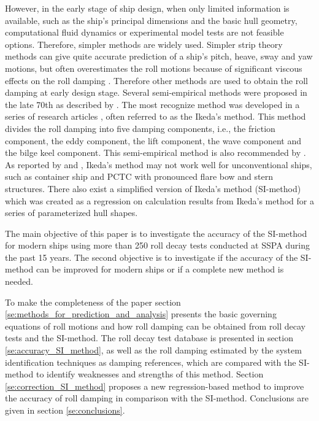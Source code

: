 However, in the early stage of ship design, when only limited information is available, such as the ship's principal dimensions and the basic hull geometry, computational fluid dynamics or experimental model tests are not feasible options.
Therefore, simpler methods are widely used. Simpler strip theory methods can give quite accurate prediction of a ship's pitch, heave, sway and yaw motions, but often overestimates the roll motions because of significant viscous effects on the roll damping \parencite{kawahara_simple_2011}. Therefore other methods are used to obtain the roll damping at early design stage. Several semi-empirical methods were proposed in the late 70th as described by  \parencite{himeno_prediction_1981}. The most recognize method was developed in a series of research articles \parencite{ikeda_roll_1978,ikeda_eddy_1978,ikeda_roll_1979,ikeda_components_1978,ikeda_velocity_1979}, often referred to as the Ikeda's method. This method divides the roll damping into five damping components, i.e., the friction component, the eddy component, the lift component, the wave component and the bilge keel component. This semi-empirical method is also recommended by \parencite{ittc_ittc_2011}. As reported by  \parencite{kawahara_simple_2011} and \parencite{soder_ikeda_2019}, Ikeda's method may not work well for unconventional ships, such as container ship and PCTC with pronounced flare bow and stern structures. 
There also exist a simplified version of  Ikeda's method \parencite{kawahara_simple_2011} (SI-method) which was created as a regression on   calculation results from Ikeda's method for a series of parameterized hull shapes. 

The main objective of this paper is to investigate the accuracy of the SI-method for modern ships using more than 250 roll decay tests conducted at SSPA during the past 15 years. The second objective is to investigate if the accuracy of the SI-method can be improved for modern ships or if a complete new method is needed. 

To make the completeness of the paper section \ref{se:methods_for_prediction_and_analysis} presents the basic governing equations of roll motions and how roll damping can be obtained from roll decay tests and the SI-method. 
The roll decay test database is presented in section \ref{se:accuracy_SI_method}, as well as the roll damping estimated by the system identification techniques as damping references, which are compared with the SI-method to identify weaknesses and strengths of this method. Section \ref{se:correction_SI_method} proposes a new regression-based method to improve the accuracy of roll damping in comparison with the SI-method. Conclusions are given in section \ref{se:conclusions}.  
